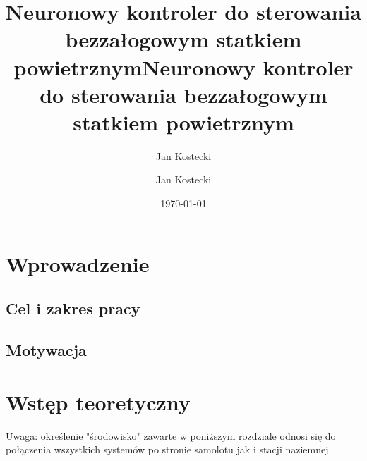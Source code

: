 \documentclass[12pt, a4paper]{article}
\title{Neuronowy kontroler do sterowania bezzałogowym statkiem powietrznym}
\author{Jan Kostecki}
\title{Neuronowy kontroler do sterowania bezzałogowym statkiem powietrznym}
\author{Jan Kostecki}
\date{\today}
\begin{document}
\onehalfspacing
\maketitle
\newpage
\tableofcontents
	
\section{Wprowadzenie}
\subsection{Cel i zakres pracy}
\subsection{Motywacja}

\section{Wstęp teoretyczny}
Uwaga: określenie "środowisko" zawarte w poniższym rozdziale odnosi się do połączenia wszystkich systemów po stronie samolotu jak i stacji naziemnej.
\end{document}
